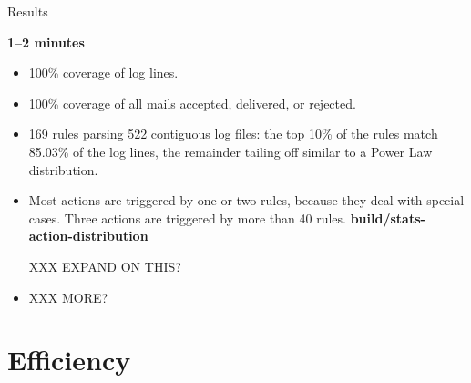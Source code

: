 \documentclass{beamer}
\newcommand{\timingnote}[1]{%
    \textbf{#1}%
}
\begin{document}
\begin{frame}{Results}

    \timingnote{1--2 minutes}

    \begin{itemize}

        \item 100\% coverage of log lines.

        \item 100\% coverage of all mails accepted, delivered, or rejected.

        \item 169 rules parsing 522 contiguous log files: the top 10\% of
            the rules match 85.03\% of the log lines, the remainder tailing
            off similar to a Power Law distribution.

        \item Most actions are triggered by one or two rules, because they
            deal with special cases.  Three actions are triggered by more
            than 40 rules.  \timingnote{build/stats-action-distribution}
            XXX EXPAND ON THIS\@?

        \item XXX MORE\@?

    \end{itemize}

\end{frame}

\section{Efficiency}
\end{document}
